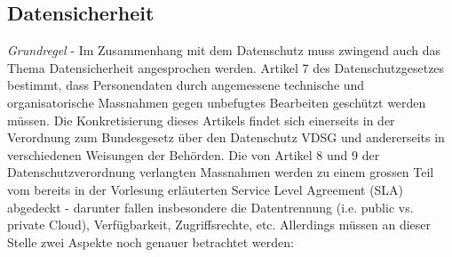 \documentclass[a4paper,pointlessnumbers]{scrreprt}
\begin{document}
\subsection{Datensicherheit}
\textit{Grundregel} - Im Zusammenhang mit dem Datenschutz muss zwingend auch das Thema Datensicherheit angesprochen werden. Artikel 7 des Datenschutzgesetzes bestimmt, dass Personendaten durch angemessene technische und organisatorische Massnahmen gegen unbefugtes Bearbeiten geschützt werden müssen. Die Konkretisierung dieses Artikels findet sich einerseits in der Verordnung zum Bundesgesetz über den Datenschutz VDSG und andererseits in verschiedenen Weisungen der Behörden. Die von Artikel 8 und 9 der Datenschutzverordnung verlangten Massnahmen werden zu einem grossen Teil vom bereits in der Vorlesung erläuterten Service Level Agreement (SLA) abgedeckt - darunter fallen insbesondere die Datentrennung (i.e. public vs. private Cloud), Verfügbarkeit, Zugriffsrechte, etc. Allerdings müssen an dieser Stelle zwei Aspekte noch genauer betrachtet werden:
\end{document}
